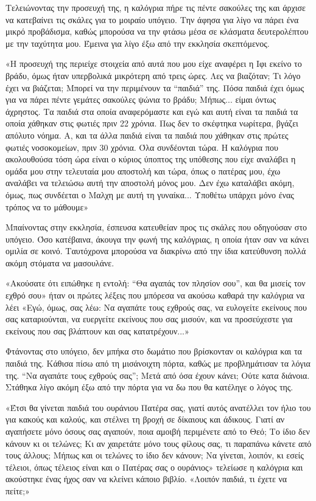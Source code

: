 \documentclass[12pt,twoside, openany]{book}
\begin{document}
Τελειώνοντας την προσευχή της, η καλόγρια πήρε τις πέντε σακούλες της και άρχισε να κατεβαίνει τις σκάλες για το μοιραίο υπόγειο. Την άφησα για λίγο να πάρει ένα μικρό προβάδισμα, καθώς μπορούσα να την φτάσω μέσα σε κλάσματα δευτερολέπτου με την ταχύτητα μου. Έμεινα για λίγο έξω από την εκκλησία σκεπτόμενος.

«Η προσευχή της περιείχε στοιχεία από αυτά που μου είχε αναφέρει η Ιφι εκείνο το βράδυ, όμως ήταν υπερβολικά μικρότερη από τρεις ώρες. Λες να βιαζόταν; Τι λόγο έχει να βιάζεται; Μπορεί να την περιμένουν τα “παιδιά” της. Πόσα παιδιά έχει όμως για να πάρει πέντε γεμάτες σακούλες ψώνια το βράδυ; Μήπως... είμαι όντως άχρηστος. Τα παιδιά στα οποία αναφερόμαστε και εγώ και αυτή είναι τα παιδιά τα οποία χάθηκαν στις φωτιές πριν 22 χρόνια. Πως δεν το σκέφτηκα νωρίτερα, βγάζει απόλυτο νόημα. Α, και τα άλλα παιδιά είναι τα παιδιά που χάθηκαν στις πρώτες φωτιές νοσοκομείων, πριν 30 χρόνια. Όλα συνδέονται τώρα. Η καλόγρια που ακολουθούσα τόση ώρα είναι ο κύριος ύποπτος της υπόθεσης που είχε αναλάβει η ομάδα μου στην τελευταία μου αποστολή και τώρα, όπως ο πατέρας μου, έχω αναλάβει να τελειώσω αυτή την αποστολή μόνος μου. Δεν έχω καταλάβει ακόμη, όμως, πως συνδέεται ο Μαλχη με αυτή τη γυναίκα... Υποθέτω υπάρχει μόνο ένας τρόπος να το μάθουμε»

Μπαίνοντας στην εκκλησία, έσπευσα κατευθείαν προς τις σκάλες που οδηγούσαν στο υπόγειο. Όσο κατέβαινα, άκουγα την φωνή της καλόγριας, η οποία ήταν σαν να κάνει ομιλία σε κοινό. Ταυτόχρονα μπορούσα να διακρίνω από την ίδια κατεύθυνση πολλά ακόμη στόματα να μασουλάνε.

«Ακούσατε ότι ειπώθηκε η εντολή: “Θα αγαπάς τον πλησίον σου”, και θα μισείς τον εχθρό σου» ήταν οι πρώτες λέξεις που μπόρεσα να ακούσω καθαρά την καλόγρια να λέει «Εγώ, όμως, σας λέω: Να αγαπάτε τους εχθρούς σας, να ευλογείτε εκείνους που σας καταριούνται, να ευεργείτε εκείνους που σας μισούν, και να προσεύχεστε για εκείνους που σας βλάπτουν και σας κατατρέχουν...»

Φτάνοντας στο υπόγειο, δεν μπήκα στο δωμάτιο που βρίσκονταν οι καλόγρια και τα παιδιά της. Κάθισα πίσω από τη μισάνοιχτη πόρτα, καθώς με προβλημάτισαν τα λόγια της. “Να αγαπάτε τους εχθρούς σας”; Μετά από όσα έχουν κάνει; Ούτε κατα διάνοια. Στάθηκα λίγο ακόμη έξω από την πόρτα για να δω που θα κατέληγε ο λόγος της.

«Έτσι θα γίνεται παιδιά του ουράνιου Πατέρα σας, γιατί αυτός ανατέλλει τον ήλιο του για κακούς και καλούς, και στέλνει τη βροχή σε δίκαιους και άδικους. Γιατί αν αγαπήσετε μόνο όσους σας αγαπούν, ποια αμοιβή περιμένετε από το Θεό; Το ίδιο δεν κάνουν κι οι τελώνες; Κι αν χαιρετάτε μόνο τους φίλους σας, τι παραπάνω κάνετε από τους άλλους; Μήπως και οι τελώνες το ίδιο δεν κάνουν; Να γίνεται, λοιπόν, κι εσείς τέλειοι, όπως τέλειος είναι και ο Πατέρας σας ο ουράνιος» τελείωσε η καλόγρια και ακούστηκε ένας ήχος σαν να κλείνει κάποιο βιβλίο. «Λοιπόν παιδιά, τι έχετε να πείτε;»
\end{document}
